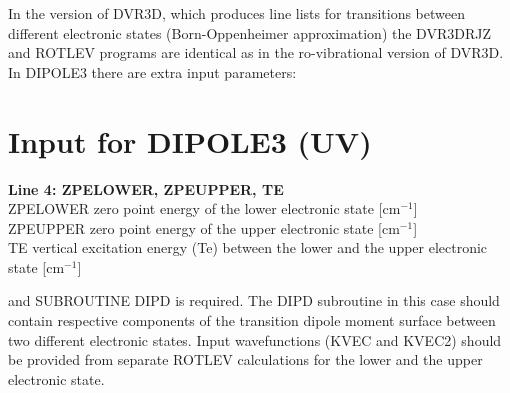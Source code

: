 \documentclass{elsart}
\begin{document}
In the version of DVR3D, which produces line lists for transitions between different electronic states (Born-Oppenheimer approximation) the DVR3DRJZ and ROTLEV programs are identical as in the ro-vibrational version of DVR3D. In DIPOLE3 there are extra input parameters:
\section{Input for DIPOLE3 (UV)}
\begin{tabbing}
{\bf Line 4: ZPELOWER, ZPEUPPER, TE}  \\
ZPELOWER \> zero point energy of the lower electronic state [cm$^{-1}$] \\
ZPEUPPER \> zero point energy of the upper electronic state  [cm$^{-1}$] \\
TE \> vertical excitation energy (Te) between the lower and the upper electronic state [cm$^{-1}$] \\
\end{tabbing}

and SUBROUTINE DIPD is required. The DIPD subroutine in this case should contain respective components of the transition dipole moment surface between two different electronic states. Input wavefunctions (KVEC and KVEC2) should be provided from separate ROTLEV calculations for the lower and the upper electronic state. 
\end{document}
